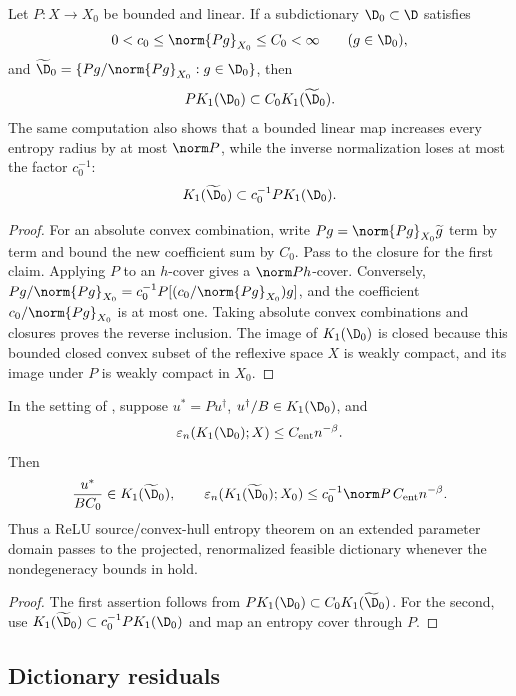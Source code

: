 \begin{lemma}
\label{lem:projection}
Let \(P:X\to X_0\) be bounded and linear. If a subdictionary \(\D_0\subset\D\) satisfies
\[
 0<c_0\leq\norm{Pg}_{X_0}\leq C_0<\infty\qquad(g\in\D_0),
\]
and \(\widetilde\D_0=\{Pg/\norm{Pg}_{X_0}:g\in\D_0\}\), then
\[
 P K_1(\D_0)\subset C_0K_1(\widetilde\D_0).
\]
The same computation also shows that a bounded linear map increases every entropy radius by at most
\(\norm P\), while the inverse normalization loses at most the factor \(c_0^{-1}\):
\[
 K_1(\widetilde\D_0)\subset c_0^{-1}P K_1(\D_0).
\]
\end{lemma}

\begin{proof}
For an absolute convex combination, write
\(Pg=\norm{Pg}_{X_0}\widetilde g\) term by term and bound the new coefficient sum by \(C_0\).
Pass to the closure for the first claim. Applying \(P\) to an \(h\)-cover gives a
\(\norm P h\)-cover. Conversely,
\(Pg/\norm{Pg}_{X_0}=c_0^{-1}P[(c_0/\norm{Pg}_{X_0})g]\), and the coefficient
\(c_0/\norm{Pg}_{X_0}\) is at most one. Taking absolute convex combinations and closures proves the
reverse inclusion. The image of \(K_1(\D_0)\) is closed because this bounded closed convex subset of the reflexive space \(X\) is weakly compact, and its image under \(P\) is weakly compact in \(X_0\).
\end{proof}

\begin{corollary}
\label{cor:projected-source-entropy}
In the setting of , suppose \(u^*=Pu^\dagger\),
\(u^\dagger/B\in K_1(\D_0)\), and
\[
 \varepsilon_n(K_1(\D_0);X)\leq C_{\rm ent}n^{-\beta}.
\]
Then
\[
 \frac{u^*}{BC_0}\in K_1(\widetilde\D_0),
 \qquad
 \varepsilon_n(K_1(\widetilde\D_0);X_0)
 \leq c_0^{-1}\norm P\,C_{\rm ent}n^{-\beta}.
\]
Thus a ReLU source/convex-hull entropy theorem on an extended parameter domain passes to the projected,
renormalized feasible dictionary whenever the nondegeneracy bounds in  hold.
\end{corollary}

\begin{proof}
The first assertion follows from
\(PK_1(\D_0)\subset C_0K_1(\widetilde\D_0)\). For the second, use
\(K_1(\widetilde\D_0)\subset c_0^{-1}PK_1(\D_0)\) and map an entropy cover through \(P\).
\end{proof}

\subsection{Dictionary residuals}

